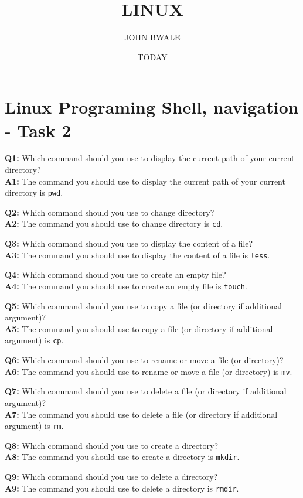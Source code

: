 \documentclass{article}
\author{JOHN BWALE}
\title{LINUX}
\date{TODAY}
\begin{document}
\section{  Linux Programing Shell, navigation - Task 2 }
\textbf{Q1:} Which command should you use to display the current path of your current directory? \\
\textbf{A1:} The command you should use to display the current path of your current directory is \texttt{pwd}.

\textbf{Q2:} Which command should you use to change directory? \\
\textbf{A2:} The command you should use to change directory is \texttt{cd}.

\textbf{Q3:} Which command should you use to display the content of a file? \\
\textbf{A3:} The command you should use to display the content of a file is \texttt{less}.

\textbf{Q4:} Which command should you use to create an empty file? \\
\textbf{A4:} The command you should use to create an empty file is \texttt{touch}.

\textbf{Q5:} Which command should you use to copy a file (or directory if additional argument)? \\
\textbf{A5:} The command you should use to copy a file (or directory if additional argument) is \texttt{cp}.

\textbf{Q6:} Which command should you use to rename or move a file (or directory)? \\
\textbf{A6:} The command you should use to rename or move a file (or directory) is \texttt{mv}.

\textbf{Q7:} Which command should you use to delete a file (or directory if additional argument)? \\
\textbf{A7:} The command you should use to delete a file (or directory if additional argument) is \texttt{rm}.

\textbf{Q8:} Which command should you use to create a directory? \\
\textbf{A8:} The command you should use to create a directory is \texttt{mkdir}.

\textbf{Q9:} Which command should you use to delete a directory? \\
\textbf{A9:} The command you should use to delete a directory is \texttt{rmdir}.
\end{document}
